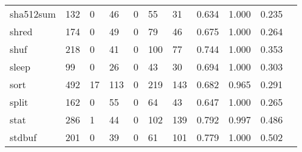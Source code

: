 \begin{longtable}{lp{1.10cm}p{1.10cm}p{1.10cm}p{1.10cm}p{1.10cm}p{1.10cm}p{1.10cm}p{1.10cm}p{1.10cm}p{1.10cm}}
sha512sum &                    132 &                                  0 &                                46 &                                0 &                                55 &                              31 &                          0.634 &                                 1.000 &                               0.235 \\
shred     &                    174 &                                  0 &                                49 &                                0 &                                79 &                              46 &                          0.675 &                                 1.000 &                               0.264 \\
shuf      &                    218 &                                  0 &                                41 &                                0 &                               100 &                              77 &                          0.744 &                                 1.000 &                               0.353 \\
sleep     &                     99 &                                  0 &                                26 &                                0 &                                43 &                              30 &                          0.694 &                                 1.000 &                               0.303 \\
sort      &                    492 &                                 17 &                               113 &                                0 &                               219 &                             143 &                          0.682 &                                 0.965 &                               0.291 \\
split     &                    162 &                                  0 &                                55 &                                0 &                                64 &                              43 &                          0.647 &                                 1.000 &                               0.265 \\
stat      &                    286 &                                  1 &                                44 &                                0 &                               102 &                             139 &                          0.792 &                                 0.997 &                               0.486 \\
stdbuf    &                    201 &                                  0 &                                39 &                                0 &                                61 &                             101 &                          0.779 &                                 1.000 &                               0.502 \\

\end{longtable}
